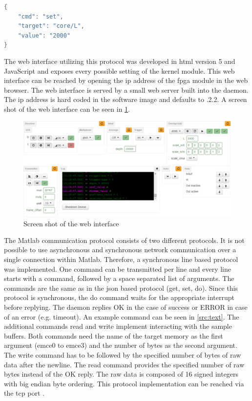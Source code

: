 \documentclass[12pt,a4paper,parskip=full,abstract=true,BCOR=12mm,twoside,open=right]{scrreprt}
\newcommand{\hack}{}
\begin{document}
\begin{lstlisting}[language=Java,float=htb,caption={Example \gls{json} formated packet to set $\gls{L}=2000$},label=src:json,basicstyle=\hack\scriptsize]
{
    "cmd": "set",
    "target": "core/L",
    "value": "2000"
}
\end{lstlisting}

The web interface utilizing this protocol was developed in \gls{html} version 5 and JavaScript and exposes
every possible setting of the kernel module. This web interface can be reached
by opening the \gls{ip} address of the \gls{fpga} module in the web browser. The
web interface is served by a small web server built into the daemon. The \gls{ip}
address is hard coded in the software image and defaults to {.2.2}.
A screen shot of the web interface can be seen in \cref{fig:webinterface}.

\begin{figure}[htb]
    \centering
    \includegraphics[width=\textwidth]{webinterface}
    \caption{Screen shot of the web interface}
    \label{fig:webinterface}
\end{figure}

The Matlab communication protocol consists of two different protocols. It is not
possible to use asynchronous and synchronous network communication over a single
connection within Matlab. Therefore, a synchronous line based protocol was implemented.
One command can be transmitted per line and every line starts with a command, followed
by a space separated list of arguments. The commands are the same as in the \gls{json}
based protocol ({\ttfamily get}, {\ttfamily set}, {\ttfamily do}). Since this protocol is synchronous, the
{\ttfamily do} command waits for the appropriate interrupt before replying. The daemon replies
{\ttfamily OK} in the case of success or {\ttfamily ERROR} in case of an error (e.g. timeout). An example
command can be seen in \cref{src:text}. The additional commands {\ttfamily read} and {\ttfamily write}
implement interacting with the sample buffers. Both commands need the name of the target memory as
the first argument ({\ttfamily emce0} to {\ttfamily emce3}) and the number of bytes as the second
argument. The {\ttfamily write} command has to be followed by the specified number of bytes of raw data after the
newline. The {\ttfamily read} command provides the specified number of raw bytes instead of the {\ttfamily OK} reply.
The raw data is composed of \SI{16}{\bit} signed integers with big endian byte ordering. This protocol implementation
can be reached via the \gls{tcp} port {}.
\end{document}
